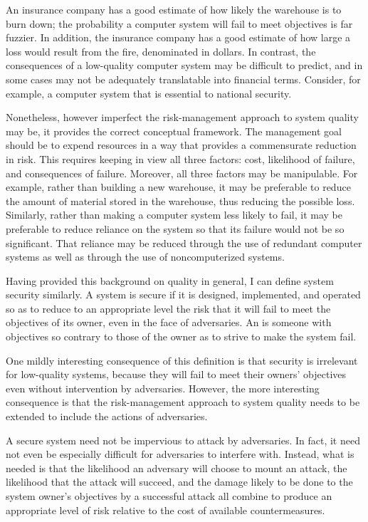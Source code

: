 An insurance company has a good estimate of how likely the warehouse
is to burn down; the probability a computer system will fail to meet
objectives is far fuzzier.  In addition, the insurance company has a good
estimate of how large a loss would result from the fire, denominated
in dollars.  In contrast, the consequences of a low-quality computer
system may be difficult to predict, and in some cases may not be
adequately translatable into financial terms.  Consider, for example,
a computer system that is essential to national security.

Nonetheless, however imperfect the risk-management approach to
system quality may be, it provides the correct conceptual framework.
The management goal should be to expend resources in a way that
provides a commensurate reduction in risk.  This requires keeping in
view all three factors: cost, likelihood of failure, and consequences
of failure.  Moreover, all three factors may be manipulable.  For
example, rather than building a new warehouse, it may be preferable to
reduce the amount of material stored in the warehouse, thus reducing
the possible loss.  Similarly, rather than making a computer system
less likely to fail, it may be preferable to reduce reliance on the
system so that its failure would not be so significant.  That
reliance may be reduced through the use of redundant computer systems
as well as through the use of noncomputerized systems.

Having provided this background on quality in general, I can define
system security similarly.  A system is secure if it is designed,
implemented, and operated so as to reduce to an appropriate level the
risk that it will fail to meet the objectives of its owner, even in
the face of adversaries.  An  is someone with
objectives so contrary to those of the owner as to strive to make the
system fail.

One mildly interesting consequence of this definition is that security
is irrelevant for low-quality systems, because they will fail to meet
their owners' objectives even without intervention by adversaries.
However, the more interesting consequence is that the risk-management
approach to system quality needs to be extended to include the actions
of adversaries.

A secure system need not be impervious to attack by adversaries.  In
fact, it need not even be especially difficult for adversaries to
interfere with.  Instead, what is needed is that the likelihood an
adversary will choose to mount an attack, the likelihood that the
attack will succeed, and the damage likely to be done to the system
owner's objectives by a successful attack all combine to produce an
appropriate level of risk relative to the cost of available
countermeasures.

